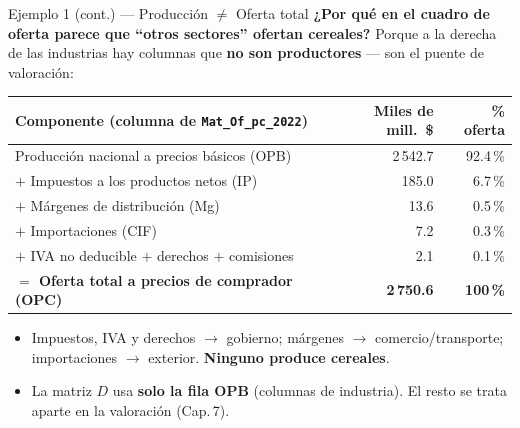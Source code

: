 \documentclass[aspectratio=169,10pt]{beamer}
\begin{document}
\begin{frame}{Ejemplo 1 (cont.) — Producción $\neq$ Oferta total}
  \textbf{¿Por qué en el cuadro de oferta parece que ``otros sectores'' ofertan cereales?}
  Porque a la derecha de las industrias hay columnas que \textbf{no son productores} — son el puente de valoración:
  \begin{center}
  \begin{tabular}{lrr}
    \toprule
    Componente (columna de \texttt{Mat\_Of\_pc\_2022}) & Miles de mill.\ \$ & \% oferta \\
    \midrule
    Producción nacional a precios básicos (OPB) & 2\,542.7 & 92.4\,\% \\
    $+$ Impuestos a los productos netos (IP) & 185.0 & \phantom{0}6.7\,\% \\
    $+$ Márgenes de distribución (Mg) & 13.6 & \phantom{0}0.5\,\% \\
    $+$ Importaciones (CIF) & 7.2 & \phantom{0}0.3\,\% \\
    $+$ IVA no deducible \; $+$ derechos \; $+$ comisiones & 2.1 & \phantom{0}0.1\,\% \\
    \midrule
    \textbf{$=$ Oferta total a precios de comprador (OPC)} & \textbf{2\,750.6} & \textbf{100\,\%} \\
    \bottomrule
  \end{tabular}
  \end{center}
  \begin{itemize}\footnotesize
    \item Impuestos, IVA y derechos $\to$ gobierno; márgenes $\to$ comercio/transporte; importaciones $\to$ exterior. \textbf{Ninguno produce cereales}.
    \item La matriz $D$ usa \textbf{solo la fila OPB} (columnas de industria). El resto se trata aparte en la valoración (Cap.\,7).
  \end{itemize}
\end{frame}
\end{document}
